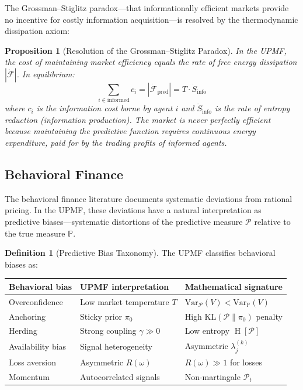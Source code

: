 \documentclass[12pt,a4paper]{article}
\newtheorem{proposition}[theorem]{Proposition}
\theoremstyle{definition}
\newtheorem{definition}[theorem]{Definition}
\newcommand{\Prob}{\mathbb{P}}
\newcommand{\PP}{\mathcal{P}}
\newcommand{\KL}{\mathrm{KL}}
\newcommand{\Var}{\mathrm{Var}}
\DeclareMathOperator{\Ent}{H}
\begin{document}
The Grossman--Stiglitz paradox---that informationally efficient markets provide no incentive for costly information acquisition---is resolved by the thermodynamic dissipation axiom:

\begin{proposition}[Resolution of the Grossman--Stiglitz Paradox]\label{prop:gs_resolution}
In the UPMF, the cost of maintaining market efficiency equals the rate of free energy dissipation $|\dot{\mathcal{F}}|$. In equilibrium:
\begin{equation}
    \sum_{i \in \text{informed}} c_i = |\dot{\mathcal{F}}_{\text{pred}}| = T \cdot \dot{S}_{\text{info}}
\end{equation}
where $c_i$ is the information cost borne by agent $i$ and $\dot{S}_{\text{info}}$ is the rate of entropy reduction (information production). The market is never perfectly efficient because maintaining the predictive function requires continuous energy expenditure, paid for by the trading profits of informed agents.
\end{proposition}

\subsection{Behavioral Finance}\label{sec:lit_behavioral}

The behavioral finance literature \citep{kahneman1979,thaler2015,barberis2003} documents systematic deviations from rational pricing. In the UPMF, these deviations have a natural interpretation as predictive biases---systematic distortions of the predictive measure $\PP$ relative to the true measure $\Prob$.

\begin{definition}[Predictive Bias Taxonomy]\label{def:bias_taxonomy}
The UPMF classifies behavioral biases as:
\begin{center}
\begin{tabular}{lll}
\toprule
\textbf{Behavioral bias} & \textbf{UPMF interpretation} & \textbf{Mathematical signature} \\
\midrule
Overconfidence & Low market temperature $T$ & $\Var_\PP(V) < \Var_\Prob(V)$ \\
Anchoring & Sticky prior $\pi_0$ & High $\KL(\PP \| \pi_0)$ penalty \\
Herding & Strong coupling $\gamma \gg 0$ & Low entropy $\Ent[\PP]$ \\
Availability bias & Signal heterogeneity & Asymmetric $\lambda_j^{(k)}$ \\
Loss aversion & Asymmetric $R(\omega)$ & $R(\omega) \gg 1$ for losses \\
Momentum & Autocorrelated signals & Non-martingale $\PP_t$ \\
\bottomrule
\end{tabular}
\end{center}
\end{definition}
\end{document}

